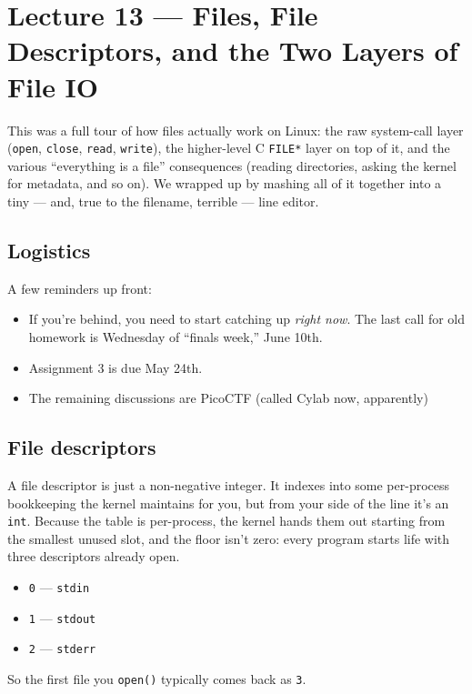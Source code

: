 \documentclass[11pt]{article}
\begin{document}
\section{Lecture 13 --- Files, File Descriptors, and the Two Layers of File IO}

This was a full tour of how files actually work on Linux: the raw
system-call layer (\texttt{open}, \texttt{close}, \texttt{read},
\texttt{write}), the higher-level C \texttt{FILE*} layer on top of
it, and the various ``everything is a file'' consequences (reading
directories, asking the kernel for metadata, and so on). We wrapped
up by mashing all of it together into a tiny --- and, true to the
filename, terrible --- line editor.

\subsection*{Logistics}

A few reminders up front:
\begin{itemize}
  \item If you're behind, you need to start catching up \emph{right
    now}. The last call for old homework is Wednesday of ``finals
    week,'' June 10th.
  \item Assignment 3 is due May 24th.
  \item The remaining discussions are PicoCTF (called Cylab now, apparently)
\end{itemize}

\subsection*{File descriptors}

A file descriptor is just a non-negative integer. It indexes into
some per-process bookkeeping the kernel maintains for you, but from
your side of the line it's an \texttt{int}. Because the table is
per-process, the kernel hands them out starting from the smallest
unused slot, and the floor isn't zero: every program starts life
with three descriptors already open.

\begin{itemize}
  \item \texttt{0} --- \texttt{stdin}
  \item \texttt{1} --- \texttt{stdout}
  \item \texttt{2} --- \texttt{stderr}
\end{itemize}

So the first file you \texttt{open()} typically comes back as
\texttt{3}.
\end{document}
